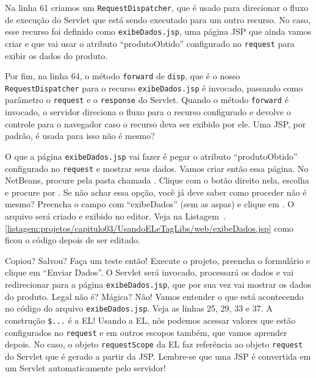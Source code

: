 Na linha 61 criamos um \texttt{RequestDispatcher}, que é usado para direcionar o fluxo de execução do Servlet que está sendo executado para um outro recurso. No caso, esse recurso foi definido como \texttt{exibeDados.jsp}, uma página JSP que ainda vamos criar e que vai usar o atributo ``produtoObtido'' configurado no \texttt{request} para exibir os dados do produto.

Por fim, na linha 64, o método \texttt{forward} de \texttt{disp}, que é o nosso \texttt{RequestDispatcher} para o recurso \texttt{exibeDados.jsp} é invocado, passando como parâmetro o \texttt{request} e o \texttt{response} do Servlet. Quando o método \texttt{forward} é invocado, o servidor direciona o fluxo para o recurso configurado e devolve o controle para o navegador caso o recurso deva ser exibido por ele. Uma JSP, por padrão, é usada para isso não é mesmo?

O que a página \texttt{exibeDados.jsp} vai fazer é pegar o atributo ``produtoObtido'' configurado no \texttt{request} e mostrar seus dados. Vamos criar então essa página. No NetBeans, procure pela pasta chamada . Clique com o botão direito nela, escolha  e procure por . Se não achar essa opção, você já deve saber como proceder não é mesmo? Preencha o campo  com ``exibeDados'' (sem as aspas) e clique em . O arquivo será criado e exibido no editor. Veja na Listagem~\thechapter.\ref{listagem:projetos/capitulo03/UsandoELeTagLibs/web/exibeDados.jsp} como ficou o código depois de ser editado.


Copiou? Salvou? Faça um teste então! Execute o projeto, preencha o formulário e clique em ``Enviar Dados''. O Servlet será invocado, processará os dados e vai redirecionar para a página \texttt{exibeDados.jsp}, que por sua vez vai mostrar os dados do produto. Legal não é? Mágica? Não! Vamos entender o que está acontecendo no código do arquivo \texttt{exibeDados.jsp}. Veja as linhas 25, 29, 33 e 37. A construção \texttt{\${...}} é a EL! Usando a EL, nós podemos acessar valores que estão configurados no \texttt{request} e em outros escopos também, que vamos aprender depois. No caso, o objeto \texttt{requestScope} da EL faz referência ao objeto \texttt{request} do Servlet que é gerado a partir da JSP. Lembre-se que uma JSP é convertida em um Servlet automaticamente pelo servidor!

